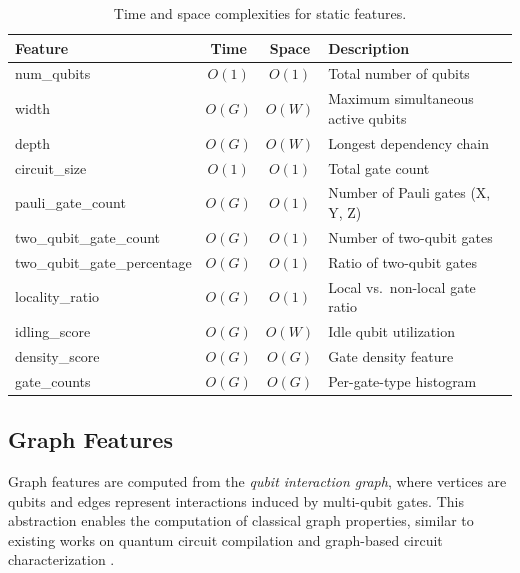 \begin{table}[t]
\centering
\caption{Time and space complexities for static features.}
\label{tbl:static}

{\small
\setlength{\tabcolsep}{4pt}
\renewcommand{\arraystretch}{1.0}
\begin{tabularx}{0.8\columnwidth}{@{}lccY@{}}
\hline
\textbf{Feature} & \textbf{Time} & \textbf{Space} & \textbf{Description} \\
\hline
num\_qubits & $O(1)$ & $O(1)$ & Total number of qubits \\
width & $O(G)$ & $O(W)$ & Maximum simultaneous active qubits \\
depth & $O(G)$ & $O(W)$ & Longest dependency chain \\
circuit\_size & $O(1)$ & $O(1)$ & Total gate count \\
pauli\_gate\_count & $O(G)$ & $O(1)$ & Number of Pauli gates (X, Y, Z) \\
two\_qubit\_gate\_count & $O(G)$ & $O(1)$ & Number of two-qubit gates \\
two\_qubit\_gate\_percentage & $O(G)$ & $O(1)$ & Ratio of two-qubit gates \\
locality\_ratio & $O(G)$ & $O(1)$ & Local vs.\ non-local gate ratio \\
idling\_score & $O(G)$ & $O(W)$ & Idle qubit utilization \\
density\_score & $O(G)$ & $O(G)$ & Gate density feature \cite{bandic2024profilingquantumcircuitsefficient} \\
gate\_counts & $O(G)$ & $O(G)$ & Per-gate-type histogram \\
\hline
\end{tabularx}
}
\end{table}

\subsection{Graph Features}
\label{ssec:graphf}
Graph features are computed from the \emph{qubit interaction graph}, where
vertices are qubits and edges represent interactions induced by multi-qubit
gates. This abstraction enables the computation of classical graph properties,
similar to existing works on quantum circuit compilation \cite{Bandic_2023,bandic2024profilingquantumcircuitsefficient}
and graph-based circuit characterization \cite{Hernndez2015ClassificationOG}.

